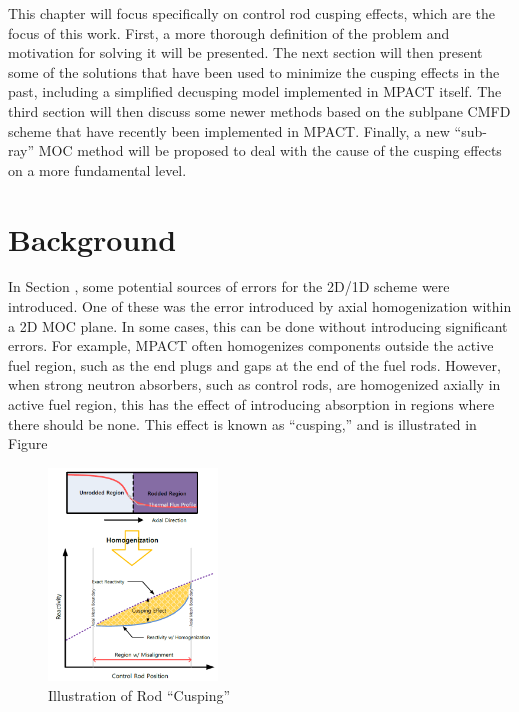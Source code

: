 This chapter will focus specifically on control rod cusping effects, which are the focus of this work.  First, a more thorough definition of the problem and motivation for solving it will be presented.  The next section will then present some of the solutions that have been used to minimize the cusping effects in the past, including a simplified decusping model implemented in MPACT itself.  The third section will then discuss some newer methods based on the sublpane CMFD scheme that have recently been implemented in MPACT.  Finally, a new ``sub-ray'' MOC method will be proposed to deal with the cause of the cusping effects on a more fundamental level.

\section{Background}

In Section , some potential sources of errors for the 2D/1D scheme were introduced.  One of these was the error introduced by axial homogenization within a 2D MOC plane.  In some cases, this can be done without introducing significant errors.  For example, MPACT often homogenizes components outside the active fuel region, such as the end plugs and gaps at the end of the fuel rods.  However, when strong neutron absorbers, such as control rods, are homogenized axially in active fuel region, this has the effect of introducing absorption in regions where there should be none.  This effect is known as ``cusping,'' and is illustrated in Figure 

\begin{figure}
    \centering
    \includegraphics[width=0.4\textwidth]{figs/cusping_effect_Joo.png}
    \caption{Illustration of Rod ``Cusping''}\label{f:cuspingEffectJoo}
\end{figure}

